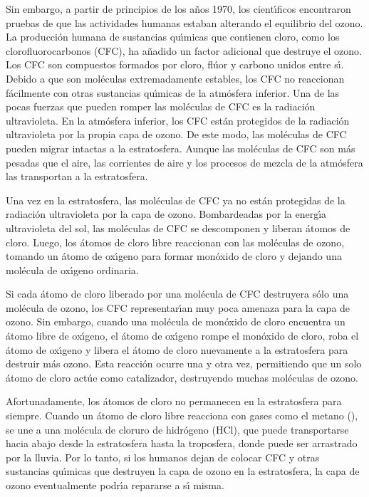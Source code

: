 Sin embargo, a partir de principios de los a\~nos 1970, los cient\'{\i}ficos encontraron pruebas de que las actividades humanas estaban alterando el equilibrio del ozono. La producci\'on humana de sustancias qu\'{\i}micas que contienen cloro, como los clorofluorocarbonos (CFC), ha a\~nadido un factor adicional que destruye el ozono. Los CFC son compuestos formados por cloro, fl\'uor y carbono unidos entre s\'{\i}. Debido a que son mol\'eculas extremadamente estables, los CFC no reaccionan f\'acilmente con otras sustancias qu\'{\i}micas de la atm\'osfera inferior. Una de las pocas fuerzas que pueden romper las mol\'eculas de CFC es la radiaci\'on ultravioleta. En la atm\'osfera inferior, los CFC est\'an protegidos de la radiaci\'on ultravioleta por la propia capa de ozono. De este modo, las mol\'eculas de CFC pueden migrar intactas a la estratosfera. Aunque las mol\'eculas de CFC son m\'as pesadas que el aire, las corrientes de aire y los procesos de mezcla de la atm\'osfera las transportan a la estratosfera.

Una vez en la estratosfera, las mol\'eculas de CFC ya no est\'an protegidas de la radiaci\'on ultravioleta por la capa de ozono. Bombardeadas por la energ\'{\i}a ultravioleta del sol, las mol\'eculas de CFC se descomponen y liberan \'atomos de cloro. Luego, los \'atomos de cloro libre reaccionan con las mol\'eculas de ozono, tomando un \'atomo de ox\'{\i}geno para formar mon\'oxido de cloro y dejando una mol\'ecula de ox\'{\i}geno ordinaria.

Si cada \'atomo de cloro liberado por una mol\'ecula de CFC destruyera s\'olo una mol\'ecula de ozono, los CFC representar\'{\i}an muy poca amenaza para la capa de ozono. Sin embargo, cuando una mol\'ecula de mon\'oxido de cloro encuentra un \'atomo libre de ox\'{\i}geno, el \'atomo de ox\'{\i}geno rompe el mon\'oxido de cloro, roba el \'atomo de ox\'{\i}geno y libera el \'atomo de cloro nuevamente a la estratosfera para destruir m\'as ozono. Esta reacci\'on ocurre una y otra vez, permitiendo que un solo \'atomo de cloro act\'ue como catalizador, destruyendo muchas mol\'eculas de ozono.

Afortunadamente, los \'atomos de cloro no permanecen en la estratosfera para siempre. Cuando un \'atomo de cloro libre reacciona con gases como el metano (), se une a una mol\'ecula de cloruro de hidr\'ogeno (HCl), que puede transportarse hacia abajo desde la estratosfera hasta la troposfera, donde puede ser arrastrado por la lluvia. Por lo tanto, si los humanos dejan de colocar CFC y otras sustancias qu\'{\i}micas que destruyen la capa de ozono en la estratosfera, la capa de ozono eventualmente podr\'{\i}a repararse a s\'{\i} misma.

